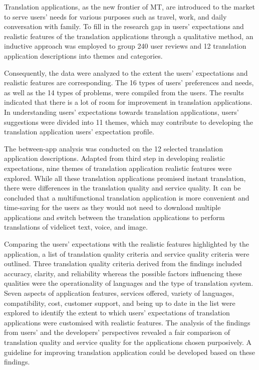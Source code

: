 \documentclass[english]{textolivre}
\begin{document}
Translation applications, as the new frontier of MT, are introduced to the market to serve users’ needs for various purposes such as travel, work, and daily conversation with family. To fill in the research gap in users’ expectations and realistic features of the translation applications through a qualitative method, an inductive approach was employed to group 240 user reviews and 12 translation application descriptions into themes and categories.

Consequently, the data were analyzed to the extent the users’ expectations and realistic features are corresponding. The 16 types of users’ preferences and needs, as well as the 14 types of problems, were compiled from the users. The results indicated that there is a lot of room for improvement in translation applications. In understanding users’ expectations towards translation applications, users’ suggestions were divided into 11 themes, which may contribute to developing the translation application users’ expectation profile.

The between-app analysis was conducted on the 12 selected translation application descriptions. Adapted from  third step in developing realistic expectations, nine themes of translation application realistic features were explored. While all these translation applications promised instant translation, there were differences in the translation quality and service quality. It can be concluded that a multifunctional translation application is more convenient and time-saving for the users as they would not need to download multiple applications and switch between the translation applications to perform translations of videlicet text, voice, and image.

Comparing the users’ expectations with the realistic features highlighted by the application, a list of translation quality criteria and service quality criteria were outlined. Three translation quality criteria derived from the findings included accuracy, clarity, and reliability whereas the possible factors influencing these qualities were the operationality of languages and the type of translation system. Seven aspects of application features, services offered, variety of languages, compatibility, cost, customer support, and being up to date in the list were explored to identify the extent to which users’ expectations of translation applications were customised with realistic features. The analysis of the findings from users' and the developers’ perspectives revealed a fair comparison of translation quality and service quality for the applications chosen purposively. A guideline for improving translation application could be developed based on these findings.
\end{document}

